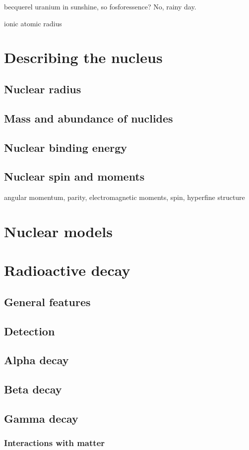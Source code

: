 becquerel uranium in sunshine, so fosforessence? No, rainy day.

ionic atomic radius

\chapter{Describing the nucleus}
\section{Nuclear radius}
\section{Mass and abundance of nuclides}
\section{Nuclear binding energy}
\section{Nuclear spin and moments}
angular momentum, parity, electromagnetic moments, spin, hyperfine structure
\chapter{Nuclear models}

\chapter{Radioactive decay}
\section{General features}
\section{Detection}
\section{Alpha decay}
\section{Beta decay}
\section{Gamma decay}
\subsection{Interactions with matter}
